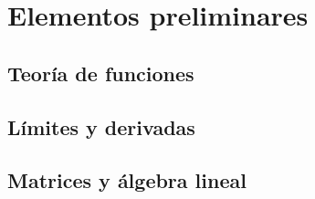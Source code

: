 
\chapter{Elementos preliminares}


\newpage


\newpage
\section{Teoría de funciones}

\newpage
\section{Límites y derivadas}

\newpage
\section{Matrices y álgebra lineal}

